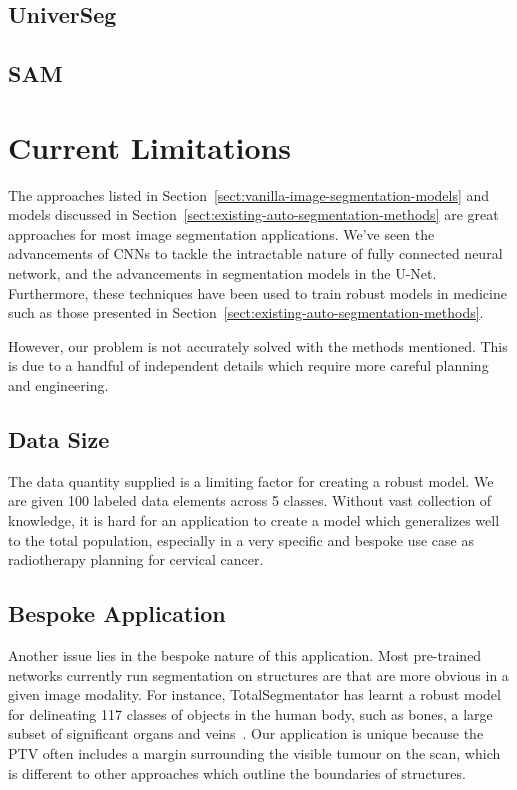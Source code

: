 \documentclass[11pt,twoside]{report}
\begin{document}
\subsection{UniverSeg}\label{sect:universeg}

\subsection{SAM}\label{sect:sam}

\section{Current Limitations}\label{sect:limitations}

The approaches listed in Section~\ref{sect:vanilla-image-segmentation-models} and models discussed in Section~\ref{sect:existing-auto-segmentation-methods} are great approaches for most image segmentation applications. We've seen the advancements of CNNs to tackle the intractable nature of fully connected neural network, and the advancements in segmentation models in the U-Net. Furthermore, these techniques have been used to train robust models in medicine such as those presented in Section~\ref{sect:existing-auto-segmentation-methods}. 

However, our problem is not accurately solved with the methods mentioned. This is due to a handful of independent details which require more careful planning and engineering.

\subsection{Data Size}\label{sect:solving-the-problem-data-size}

The data quantity supplied is a limiting factor for creating a robust model. We are given 100 labeled data elements across 5 classes. Without vast collection of knowledge, it is hard for an application to create a model which generalizes well to the total population, especially in a very specific and bespoke use case as radiotherapy planning for cervical cancer.

\subsection{Bespoke Application}\label{sect:solving-the-problem-bespoke-application}

Another issue lies in the bespoke nature of this application. Most pre-trained networks currently run segmentation on structures are that are more obvious in a given image modality. For instance, TotalSegmentator has learnt a robust model for delineating 117 classes of objects in the human body, such as bones, a large subset of significant organs and veins~\cite{totalsegmentor-git}. Our application is unique because the PTV often includes a margin surrounding the visible tumour on the scan, which is different to other approaches which outline the boundaries of structures.
\end{document}
